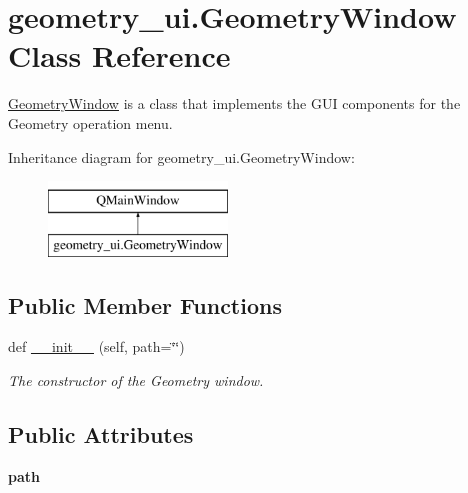 \hypertarget{classgeometry__ui_1_1_geometry_window}{}\section{geometry\+\_\+ui.\+Geometry\+Window Class Reference}
\label{classgeometry__ui_1_1_geometry_window}


\hyperlink{classgeometry__ui_1_1_geometry_window}{Geometry\+Window} is a class that implements the G\+UI components for the Geometry operation menu.  


Inheritance diagram for geometry\+\_\+ui.\+Geometry\+Window\+:\begin{figure}[H]
\begin{center}
\leavevmode
\includegraphics[height=2.000000cm]{classgeometry__ui_1_1_geometry_window}
\end{center}
\end{figure}
\subsection*{Public Member Functions}
\begin{DoxyCompactItemize}
\item 
def \hyperlink{classgeometry__ui_1_1_geometry_window_af619e3ecabaa9592f6de5987e31a27d3}{\+\_\+\+\_\+init\+\_\+\+\_\+} (self, path=\char`\"{}\char`\"{})
\begin{DoxyCompactList}\small\item\em The constructor of the Geometry window. \end{DoxyCompactList}\end{DoxyCompactItemize}
\subsection*{Public Attributes}
\begin{DoxyCompactItemize}
\item 
\mbox{\label{classgeometry__ui_1_1_geometry_window_a8babe312d482e206b2dc7250ce38badf}} 
{\bfseries path}
\end{DoxyCompactItemize}



